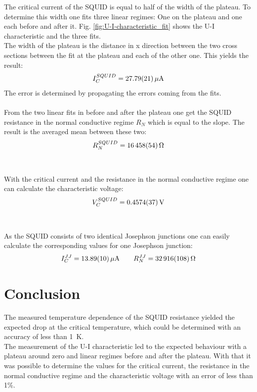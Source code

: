 \documentclass[12pt,a4paper]{article}
\begin{document}
The critical current of the SQUID is equal to half of the width of the plateau. To determine this width one fits three linear regimes: One on the plateau and one each before and after it. Fig. \ref{fig:U-I-characteristic_fit} shows the U-I characteristic and the three fits. \\
The width of the plateau is the distance in x direction between the two cross sections between the fit at the plateau and each of the other one. This yields the result:
\begin{equation*}
I_C^{SQUID} = \SI{27.79 \pm 0.21}{\mu A}
\end{equation*}
The error is determined by propagating the errors coming from the fits. \\
\\
From the two linear fits in before and after the plateau one get the SQUID resistance in the normal conductive regime $R_N$ which is equal to the slope. The result is the averaged mean between these two:
\begin{equation*}
R_N^{SQUID} = \SI{16458 \pm 54}{\Omega}
\end{equation*}\\
\\
With the critical current and the resistance in the normal conductive regime one can calculate the characteristic voltage:
\begin{equation*}
V_C^{SQUID} = \SI{0.4574 \pm 0.0037}{V}
\end{equation*}\\
\\
As the SQUID consists of two identical Josephson junctions one can easily calculate the corresponding values for one Josephson junction:
\begin{equation*}
I_C^{JJ} = \SI{13.89 \pm 0.10}{\mu A} \qquad R_N^{JJ} = \SI{32916 \pm 108}{\Omega}
\end{equation*}


\section{Conclusion}
The measured temperature dependence of the SQUID resistance yielded the expected drop at the critical temperature, which could be determined with an accuracy of less than \SI{1}{K}. \\
The measurement of the U-I characteristic led to the expected behaviour with a plateau around zero and linear regimes before and after the plateau. With that it was possible to determine the values for the critical current, the resistance in the normal conductive regime and the characteristic voltage with an error of less than 1\%.
\end{document}

